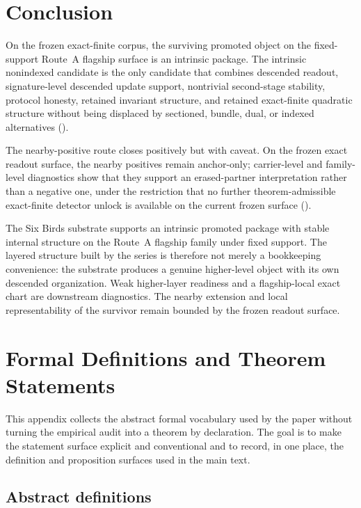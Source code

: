 \documentclass[11pt]{article}
\theoremstyle{definition}
\begin{document}
 \section{Conclusion}

On the frozen exact-finite corpus, the surviving promoted object on the fixed-support Route~A flagship surface is an intrinsic package. The intrinsic nonindexed candidate is the only candidate that combines descended readout, signature-level descended update support, nontrivial second-stage stability, protocol honesty, retained invariant structure, and retained exact-finite quadratic structure without being displaced by sectioned, bundle, dual, or indexed alternatives ().

The nearby-positive route closes positively but with caveat. On the frozen exact readout surface, the nearby positives remain anchor-only; carrier-level and family-level diagnostics show that they support an erased-partner interpretation rather than a negative one, under the restriction that no further theorem-admissible exact-finite detector unlock is available on the current frozen surface ().

The Six Birds substrate supports an intrinsic promoted package with stable internal structure on the Route~A flagship family under fixed support. The layered structure built by the series is therefore not merely a bookkeeping convenience: the substrate produces a genuine higher-level object with its own descended organization. Weak higher-layer readiness and a flagship-local exact chart are downstream diagnostics. The nearby extension and local representability of the survivor remain bounded by the frozen readout surface.
 
\appendix
\section{Formal Definitions and Theorem Statements}
\label{app:formal-definitions}

This appendix collects the abstract formal vocabulary used by the paper without turning the empirical audit into a theorem by declaration. The goal is to make the statement surface explicit and conventional and to record, in one place, the definition and proposition surfaces used in the main text.

\subsection*{Abstract definitions}
\end{document}

